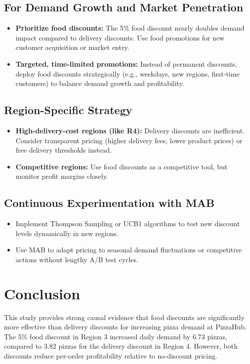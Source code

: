\documentclass[12pt]{article}
\begin{document}
\subsection{For Demand Growth and Market Penetration}
\begin{itemize}[nosep]
    \item \textbf{Prioritize food discounts:} The 5\% food discount nearly doubles demand impact compared to delivery discounts. Use food promotions for new customer acquisition or market entry.
    \item \textbf{Targeted, time-limited promotions:} Instead of permanent discounts, deploy food discounts strategically (e.g., weekdays, new regions, first-time customers) to balance demand growth and profitability.
\end{itemize}

\subsection{Region-Specific Strategy}
\begin{itemize}[nosep]
    \item \textbf{High-delivery-cost regions (like R4):} Delivery discounts are inefficient. Consider transparent pricing (higher delivery fees, lower product prices) or free delivery thresholds instead.
    \item \textbf{Competitive regions:} Use food discounts as a competitive tool, but monitor profit margins closely.
\end{itemize}

\subsection{Continuous Experimentation with MAB}
\begin{itemize}[nosep]
    \item Implement Thompson Sampling or UCB1 algorithms to test new discount levels dynamically in new regions.
    \item Use MAB to adapt pricing to seasonal demand fluctuations or competitive actions without lengthy A/B test cycles.
\end{itemize}

\section{Conclusion}

This study provides strong causal evidence that food discounts are significantly more effective than delivery discounts for increasing pizza demand at PizzaHub. The 5\% food discount in Region 3 increased daily demand by 6.73 pizzas, compared to 3.82 pizzas for the delivery discount in Region 4. However, both discounts reduce per-order profitability relative to no-discount pricing.
\end{document}
